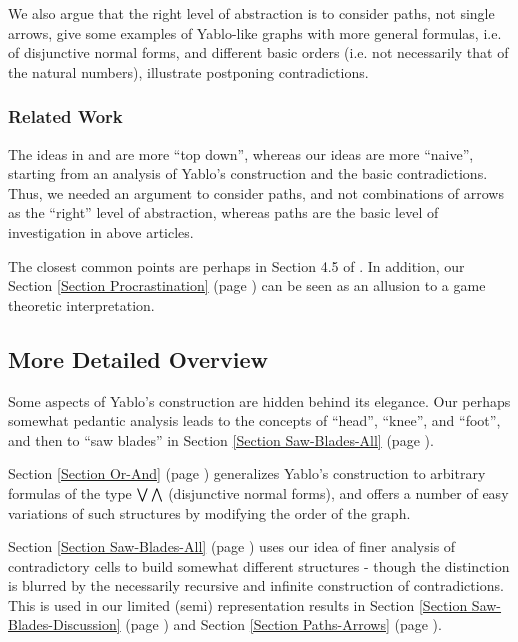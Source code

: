 We also
 \xEI
 \xDH argue that the right level of abstraction is to consider paths, not
single arrows,
 \xDH give some examples of Yablo-like graphs with more general formulas,
i.e. of disjunctive normal forms, and different basic orders (i.e. not
necessarily that of the natural numbers),
 \xDH illustrate postponing contradictions.
 \xEJ
\subsubsection{
Related Work
}


The ideas in
 \cite{BS17} and  \cite{Wal23}
are more ``top down'', whereas our ideas are more ``naive'', starting
from an analysis of Yablo's construction and the basic contradictions.
Thus, we needed an argument to consider paths, and not combinations
of arrows as the ``right'' level of abstraction, whereas paths are the
basic level of investigation in above articles.

The closest common points are perhaps in Section 4.5 of
 \cite{BS17}. In addition, our
Section \ref{Section Procrastination} (page \pageref{Section Procrastination})
can be seen as an allusion to a game theoretic interpretation.
\subsection{
More Detailed Overview
}


Some aspects of Yablo's construction
are hidden behind its elegance. Our perhaps somewhat pedantic analysis
leads to the concepts of ``head'', ``knee'', and ``foot'', and then to ``saw
blades''
in Section 
\ref{Section Saw-Blades-All} (page 
\pageref{Section Saw-Blades-All}).


Section \ref{Section Or-And} (page \pageref{Section Or-And})
generalizes Yablo's construction to
arbitrary formulas of the type $ \bigvee \bigwedge $ (disjunctive normal
forms), and offers a number of easy variations of such
structures by modifying the order of the graph.


Section 
\ref{Section Saw-Blades-All} (page 
\pageref{Section Saw-Blades-All})  uses our idea of finer analysis
of contradictory cells to build somewhat different
structures - though the distinction is blurred by the
necessarily recursive and infinite construction of contradictions.
This is used in our limited (semi) representation results in
Section 
\ref{Section Saw-Blades-Discussion} (page 
\pageref{Section Saw-Blades-Discussion})  and
Section \ref{Section Paths-Arrows} (page \pageref{Section Paths-Arrows}).


